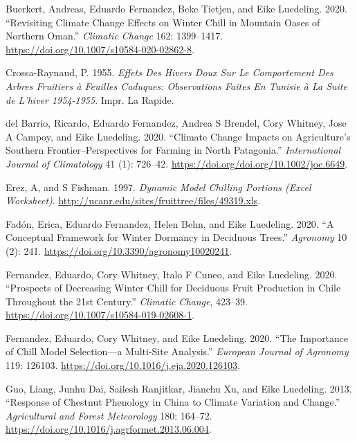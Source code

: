 \documentclass[
]{book}
\begin{document}
\leavevmode\hypertarget{ref-buerkert2020revisiting}{}%
Buerkert, Andreas, Eduardo Fernandez, Beke Tietjen, and Eike Luedeling. 2020. ``Revisiting Climate Change Effects on Winter Chill in Mountain Oases of Northern Oman.'' \emph{Climatic Change} 162: 1399--1417. \url{https://doi.org/10.1007/s10584-020-02862-8}.

\leavevmode\hypertarget{ref-crossa1955effets}{}%
Crossa-Raynaud, P. 1955. \emph{Effets Des Hivers Doux Sur Le Comportement Des Arbres Fruitiers à Feuilles Caduques: Observations Faites En Tunisie à La Suite de L'hiver 1954-1955}. Impr. La Rapide.

\leavevmode\hypertarget{ref-delclimate}{}%
del Barrio, Ricardo, Eduardo Fernandez, Andrea S Brendel, Cory Whitney, Jose A Campoy, and Eike Luedeling. 2020. ``Climate Change Impacts on Agriculture's Southern Frontier--Perspectives for Farming in North Patagonia.'' \emph{International Journal of Climatology} 41 (1): 726--42. \url{https://doi.org/doi.org/10.1002/joc.6649}.

\leavevmode\hypertarget{ref-ExcelDM}{}%
Erez, A, and S Fishman. 1997. \emph{Dynamic Model Chilling Portions (Excel Worksheet)}. \url{http://ucanr.edu/sites/fruittree/files/49319.xls}.

\leavevmode\hypertarget{ref-fadon2020conceptual}{}%
Fadón, Erica, Eduardo Fernandez, Helen Behn, and Eike Luedeling. 2020. ``A Conceptual Framework for Winter Dormancy in Deciduous Trees.'' \emph{Agronomy} 10 (2): 241. \url{https://doi.org/10.3390/agronomy10020241}.

\leavevmode\hypertarget{ref-fernandez2020prospects}{}%
Fernandez, Eduardo, Cory Whitney, Italo F Cuneo, and Eike Luedeling. 2020. ``Prospects of Decreasing Winter Chill for Deciduous Fruit Production in Chile Throughout the 21st Century.'' \emph{Climatic Change}, 423--39. \url{https://doi.org/10.1007/s10584-019-02608-1}.

\leavevmode\hypertarget{ref-fernandez2020importance}{}%
Fernandez, Eduardo, Cory Whitney, and Eike Luedeling. 2020. ``The Importance of Chill Model Selection---a Multi-Site Analysis.'' \emph{European Journal of Agronomy} 119: 126103. \url{https://doi.org/10.1016/j.eja.2020.126103}.

\leavevmode\hypertarget{ref-guo2013response}{}%
Guo, Liang, Junhu Dai, Sailesh Ranjitkar, Jianchu Xu, and Eike Luedeling. 2013. ``Response of Chestnut Phenology in China to Climate Variation and Change.'' \emph{Agricultural and Forest Meteorology} 180: 164--72. \url{https://doi.org/10.1016/j.agrformet.2013.06.004}.
\end{document}
